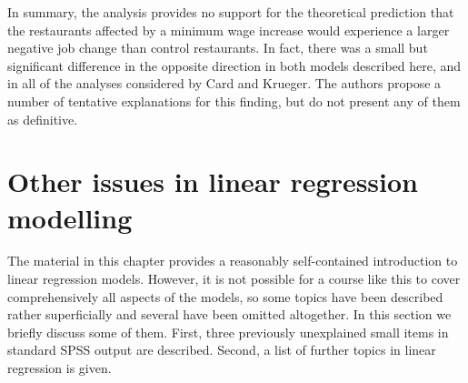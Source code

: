 In summary, the analysis provides no support for the theoretical
prediction that the restaurants affected by a minimum wage increase
would experience a larger negative job change than control restaurants.
In fact, there was a small but significant difference in the opposite
direction in both models described here, and in all of the analyses
considered by Card and Krueger. The authors propose a number of
tentative explanations for this finding, but do not present any of them
as definitive.

\section{Other issues in linear regression modelling}
\label{s_regression_rest}

The material in this chapter provides a reasonably self-contained
introduction to linear regression models. However, it is not possible
for a course like this to cover comprehensively all aspects of the
models, so some topics have been described rather superficially and
several have been omitted altogether. In this section we briefly discuss
some of them. First, three previously unexplained small items in
standard SPSS output are described. Second, a list of further topics in
linear regression is given.


